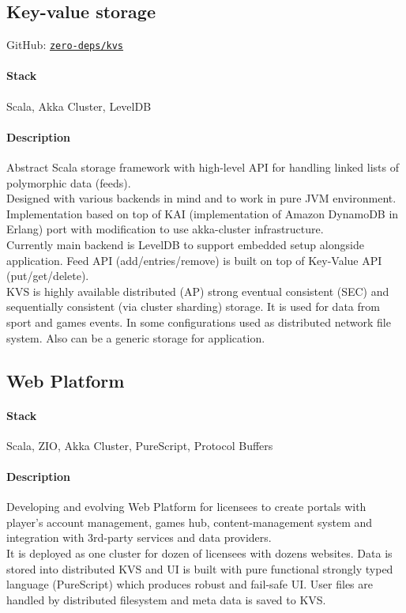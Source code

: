 \subsection{Key-value storage}
GitHub: \href{https://github.com/zero-deps/kvs}{\nolinkurl{zero-deps/kvs}}
\paragraph{Stack} Scala, Akka Cluster, LevelDB
\paragraph{Description}
Abstract Scala storage framework with high-level API for handling linked lists of polymorphic data (feeds).\\
Designed with various backends in mind and to work in pure JVM environment. Implementation based on top of KAI (implementation of Amazon DynamoDB in Erlang) port with modification to use akka-cluster infrastructure.\\
Currently main backend is LevelDB to support embedded setup alongside application. Feed API (add/entries/remove) is built on top of Key-Value API (put/get/delete).\\
KVS is highly available distributed (AP) strong eventual consistent (SEC) and sequentially consistent (via cluster sharding) storage. It is used for data from sport and games events. In some configurations used as distributed network file system. Also can be a generic storage for application.

\subsection{Web Platform}
\paragraph{Stack} Scala, ZIO, Akka Cluster, PureScript, Protocol Buffers
\paragraph{Description}
Developing and evolving Web Platform for licensees to create portals with player's account management, games hub, content-management system and integration with 3rd-party services and data providers.\\
It is deployed as one cluster for dozen of licensees with dozens websites. Data is stored into distributed KVS and UI is built with pure functional strongly typed language (PureScript) which produces robust and fail-safe UI. User files are handled by distributed filesystem and meta data is saved to KVS.

